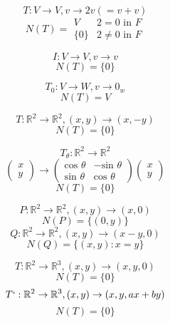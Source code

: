 \documentclass[11pt,a4paper]{colorart}
\def\l{\left}
\def\r{\right}
\def\R{\mathbb{R}}
\begin{document}
\begin{example}[Dilation]
	\[ T:V \rightarrow V,v\rightarrow 2v \l(=v+v\r)\]
	\[ N\l(T\r) = \begin{matrix} V & 2 = 0 \text{ in } F \\ \{ 0 \} & 2 \neq 0 \text{ in } F \end{matrix} \]
\end{example}

\begin{example}
	\[ I:V \rightarrow V, v\rightarrow v\]
	\[ N\l(T\r) = \{ 0 \} \]
\end{example}

\begin{example}
	\[ T_0:V\rightarrow W, v \rightarrow 0_w \]
	\[ N\l(T\r) = V \]
\end{example}

\begin{example}[Reflection]
	\[ T:\R^2 \rightarrow \R^2,\l(x,y\r)\rightarrow\l(x,-y\r) \]
	\[ N\l(T\r) = \{0\} \]
\end{example}

\begin{example}[Rotation]
	\[ T_\theta : \R^2 \rightarrow \R^2 \]
	\[ \begin{pmatrix} x\\y\end{pmatrix} \rightarrow
	   \begin{pmatrix} \text{cos }\theta &-\text{sin }\theta\\
	   \text{sin }\theta & \text{cos }\theta \end{pmatrix} 
	   \begin{pmatrix} x\\y\end{pmatrix}\]
	\[ N\l(T\r) = \{0\} \]
\end{example}

\begin{example}[Projection]
	\[ P:\R^2\rightarrow\R^2,\l(x,y\r)\rightarrow\l(x,0\r)\]
	\[ N\l(P\r) = \{\l(0,y\r)\} \]
	\[ Q:\R^2\rightarrow\R^2,\l(x,y\r)\rightarrow\l(x-y,0\r)\]
	\[ N\l(Q\r) = \{\l(x,y\r):x=y\} \]
\end{example}

\begin{example}[Inclusion]
	\[ T:\R^2\rightarrow\R^3,\l(x,y\r)\rightarrow\l(x,y,0\r)\]
	\[ N\l(T\r) = \{0\} \]
	\[ T`:\R^2\rightarrow\R^3,\l(x,y\r)\rightarrow\l(x,y,ax+by\r)\]
	\[ N\l(T\r) = \{0\} \]
\end{example}
\end{document}
